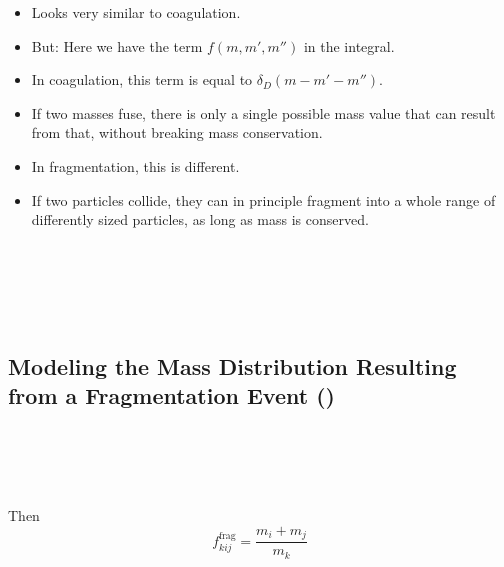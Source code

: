     \begin{itemize}
        \item Looks very similar to coagulation.
        \item But: Here we have the term $f(m,m',m'')$ in the integral.
        \item In coagulation, this term is equal to $\delta_D(m-m'-m'')$.
        \item If two masses fuse, there is only a single possible mass value that can result from 
              that, without breaking mass conservation.
        \item In fragmentation, this is different.
        \item If two particles collide, they can in principle fragment into a whole range of 
              differently sized particles, as long as mass is conserved.
    \end{itemize}

     \\
     \\

     \\
     \\

    \clearpage\subsection{Modeling the Mass Distribution Resulting from a Fragmentation Event
    ()}

         \\
         \\
         \\

         \\
        Then
        \begin{equation}
            f^\text{frag}_{kij} = \frac{m_i + m_j}{m_k}
        \end{equation}


